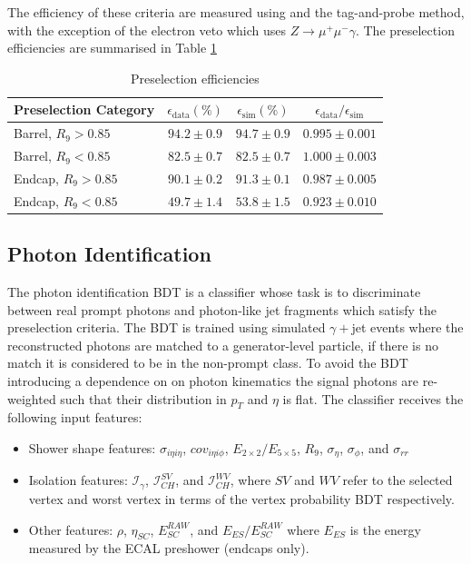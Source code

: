 The efficiency of these criteria are measured using \Zee and the tag-and-probe method, 
with the exception of the electron veto which uses $Z\rightarrow{}\mu^{+}\mu^{-}\gamma$. The preselection efficiencies are summarised in Table \ref{tab:object_reco:presel_eff}
\begin{table}[h!]
    \begin{tabular}{ l | c | c | c }
        Preselection Category& $\epsilon_{\mathrm{data}} (\%)$ & $\epsilon_{\mathrm{sim}} (\%)$ & $\epsilon_{\mathrm{data}}/\epsilon_{\mathrm{sim}}$ \\
        \hline
        Barrel, $R_{9}>0.85$ & $94.2\pm0.9$ & $94.7\pm0.9$ & $0.995\pm0.001$ \\
        Barrel, $R_{9}<0.85$ & $82.5\pm0.7$ & $82.5\pm0.7$ & $1.000\pm0.003$ \\ 
        \hline
        Endcap, $R_{9}>0.85$ & $90.1\pm0.2$ & $91.3\pm0.1$ & $0.987\pm0.005$ \\ 
        Endcap, $R_{9}<0.85$ & $49.7\pm1.4$ & $53.8\pm1.5$ & $0.923\pm0.010$ \\ 
\end{tabular}
    \caption{Preselection efficiencies}
    \label{tab:object_reco:presel_eff}
\end{table}





\subsection{Photon Identification}
The photon identification BDT is a classifier whose task is to discriminate between real prompt photons and photon-like jet fragments which satisfy the preselection criteria. 
The BDT is trained using simulated $\gamma + $jet events where the reconstructed photons are matched to a generator-level particle, if there is no match it is considered to be in the non-prompt class.
To avoid the BDT introducing a dependence on on photon kinematics the signal photons are re-weighted such that their distribution in $p_{T}$ and $\eta$ is flat. 
The classifier receives the following input features:
\begin{itemize}[noitemsep]
    \item Shower shape features: $\sigma_{i\eta{}i\eta}$, $cov_{i\eta{}i\phi}$, $E_{2\times{}2}/E_{5\times{}5}$, $R_{9}$, $\sigma_{\eta}$, $\sigma_{\phi}$, and $\sigma_{rr}$
    \item Isolation features: $\mathcal{I}_{\gamma}$, $\mathcal{I}_{CH}^{SV}$, and $\mathcal{I}_{CH}^{WV}$, where $SV$ and $WV$ refer to the selected vertex and worst vertex in terms of the vertex probability BDT respectively. 
    \item Other features: $\rho$, $\eta_{SC}$, $E_{SC}^{RAW}$, and $E_{ES}/E_{SC}^{RAW}$ where $E_{ES}$ is the energy measured by the ECAL preshower (endcaps only).
\end{itemize}

